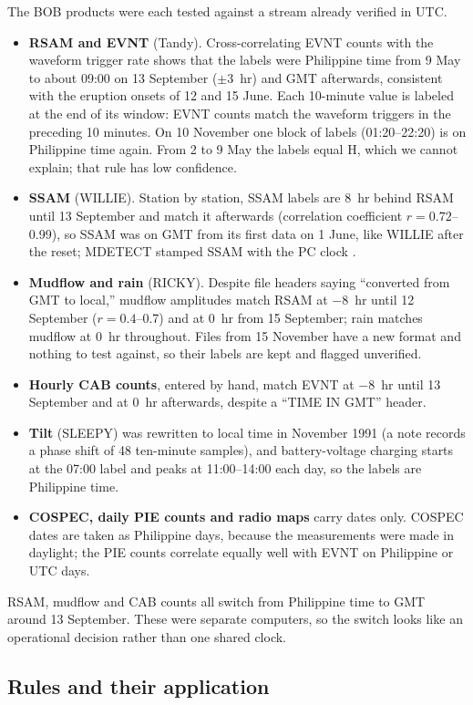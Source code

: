 \documentclass[linenum]{SSA-SRL}
\begin{document}
The BOB products were each tested against a stream already verified in UTC.
\begin{itemize}
\item \textbf{RSAM and EVNT} (Tandy). Cross-correlating EVNT counts with the waveform trigger rate shows that the labels were Philippine time from 9 May to about 09:00 on 13 September ($\pm$3~hr) and GMT afterwards, consistent with the eruption onsets of 12 and 15 June. Each 10-minute value is labeled at the end of its window: EVNT counts match the waveform triggers in the preceding 10 minutes. On 10 November one block of labels (01:20--22:20) is on Philippine time again. From 2 to 9 May the labels equal H, which we cannot explain; that rule has low confidence.
\item \textbf{SSAM} (WILLIE). Station by station, SSAM labels are 8~hr behind RSAM until 13 September and match it afterwards (correlation coefficient $r = 0.72$--0.99), so SSAM was on GMT from its first data on 1 June, like WILLIE after the reset; MDETECT stamped SSAM with the PC clock \citep{Murray_1996}.
\item \textbf{Mudflow and rain} (RICKY). Despite file headers saying ``converted from GMT to local,'' mudflow amplitudes match RSAM at $-$8~hr until 12 September ($r = 0.4$--0.7) and at 0~hr from 15 September; rain matches mudflow at 0~hr throughout. Files from 15 November have a new format and nothing to test against, so their labels are kept and flagged unverified.
\item \textbf{Hourly CAB counts}, entered by hand, match EVNT at $-$8~hr until 13 September and at 0~hr afterwards, despite a ``TIME IN GMT'' header.
\item \textbf{Tilt} (SLEEPY) was rewritten to local time in November 1991 (a note records a phase shift of 48 ten-minute samples), and battery-voltage charging starts at the 07:00 label and peaks at 11:00--14:00 each day, so the labels are Philippine time.
\item \textbf{COSPEC, daily PIE counts and radio maps} carry dates only. COSPEC dates are taken as Philippine days, because the measurements were made in daylight; the PIE counts correlate equally well with EVNT on Philippine or UTC days.
\end{itemize}
RSAM, mudflow and CAB counts all switch from Philippine time to GMT around 13 September. These were separate computers, so the switch looks like an operational decision rather than one shared clock.

\subsection{Rules and their application}
\end{document}
